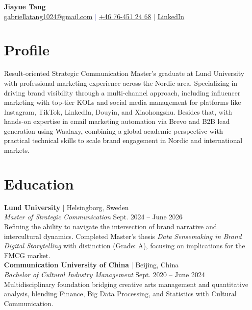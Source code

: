 \documentclass[a4paper,10pt]{article}
\begin{document}
\pagestyle{empty} %

\begin{center}
{\LARGE \textbf{Jiayue Tang}}\\[10pt]
\textcolor{darkblue}{\href{mailto:gabriellatang1024@gmail.com}{gabriellatang1024@gmail.com} | \href{tel:+46764512468}{+46 76-451 24 68}} | \href{https://www.linkedin.com/in/jiayue-tang-560878309/}{LinkedIn}
\end{center}

\section*{Profile}
Result-oriented Strategic Communication Master's graduate at Lund University with professional marketing experience across the Nordic area. Specializing in driving brand visibility through a multi-channel approach, including influencer marketing with top-tier KOLs and social media management for platforms like Instagram, TikTok, LinkedIn, Douyin, and Xiaohongshu. Besides that, with hands-on expertise in email marketing automation via Brevo and B2B lead generation using Waalaxy, combining a global academic perspective with practical technical skills to scale brand engagement in Nordic and international markets.

\section*{Education}

\textbf{Lund University} | Helsingborg, Sweden\\
\textit{Master of Strategic Communication} \hfill Sept. 2024 -- June 2026\\[4pt]
Refining the ability to navigate the intersection of brand narrative and intercultural dynamics. Completed Master's thesis \textit{Data Sensemaking in Brand Digital Storytelling} with distinction (Grade: A), focusing on implications for the FMCG market.\\[8pt]

\textbf{Communication University of China} | Beijing, China\\
\textit{Bachelor of Cultural Industry Management} \hfill Sept. 2020 -- June 2024\\[4pt]
Multidisciplinary foundation bridging creative arts management and quantitative analysis, blending Finance, Big Data Processing, and Statistics with Cultural Communication.
\end{document}
